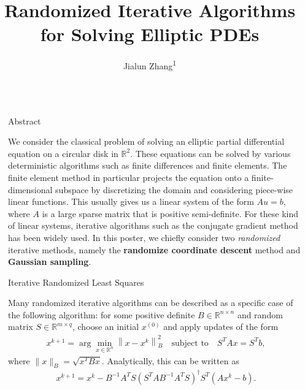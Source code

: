 \documentclass[final, 20pt]{beamer}
\title{Randomized Iterative Algorithms for Solving Elliptic PDEs} %
\author{Jialun Zhang\textsuperscript{1}}
\institute{[1] ICME, Stanford University}
\newlength{\sepwid}
\newlength{\onecolwid}
\begin{document}

\setlength{\belowcaptionskip}{2ex} %
\setlength\belowdisplayshortskip{2ex} %

\begin{frame}[t] %

\begin{columns}[t] %

\begin{column}{\sepwid}\end{column} %

\begin{column}{\onecolwid} %

\begin{alertblock}{Abstract}
\begin{flushleft}
We consider the classical problem of solving an elliptic partial differential equation on a circular disk in $\mathbb{R}^2$. These equations can be solved by various deterministic algorithms such as finite differences and finite elements. The finite element method in particular projects the equation onto a finite-dimensional subspace by discretizing the domain and considering piece-wise linear functions. This usually gives us a linear system of the form $Au=b$, where $A$ is a large sparse matrix that is positive semi-definite. For these kind of linear systems, iterative algorithms such as the conjugate gradient method has been widely used. In this poster, we chiefly consider two \textit{randomized} iterative methods, namely the \textbf{randomize coordinate descent} method and \textbf{Gaussian sampling}. 
\end{flushleft}
\end{alertblock}

\begin{alertblock}{Iterative Randomized Least Squares}
\begin{flushleft}

Many randomized iterative algorithms can be described as a specific case of the following algorithm: for some positive definite $B\in\mathbb{R}^{n\times n}$ and random matrix $S\in\mathbb{R}^{m\times q}$, choose an initial $x^{(0)}$ and apply updates of the form
\begin{align*}
	x^{k+1}=\arg \min _{x \in \mathbb{R}^{n}}\left\|x-x^{k}\right\|_{B}^{2} \quad \text {subject to} \quad S^{T} A x=S^{T} b,
\end{align*}
where $\|x\|_B = \sqrt{x^TBx}$. Analytically, this can be written as
\begin{align*}
	x^{k+1}=x^{k}-B^{-1} A^{T} S\left(S^{T} A B^{-1} A^{T} S\right)^{\dagger} S^{T}\left(A x^{k}-b\right).\label{algebra_update}
\end{align*}


\end{flushleft}
\end{alertblock}
\end{column}
\end{columns}
\end{frame}
\end{document}
